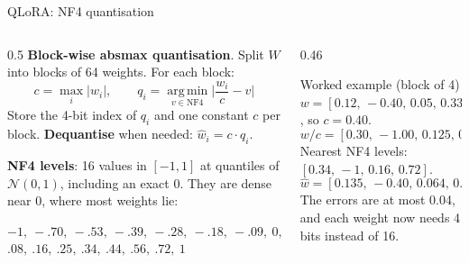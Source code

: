 \documentclass[aspectratio=169,11pt]{beamer}
\begin{document}
\begin{frame}{QLoRA: NF4 quantisation}
  \begin{columns}[T]
    \begin{column}{0.5\textwidth}
      \small
      \textbf{Block-wise absmax quantisation}. Split $W$ into blocks of 64 weights. For each block:
      \[
        c=\max_i|w_i|,\qquad q_i=\operatorname*{arg\,min}_{v\in\text{NF4}}\Big|\frac{w_i}{c}-v\Big|
      \]
      Store the 4-bit index of $q_i$ and one constant $c$ per block.
      \textbf{Dequantise} when needed: $\hat w_i = c\cdot q_i$.
      \vspace{1mm}

      \textbf{NF4 levels}: 16 values in $[-1,1]$ at quantiles of $\mathcal N(0,1)$, including an exact 0. They are dense near 0, where most weights lie:
      \vspace{1mm}

      {\scriptsize $-1,\ -.70,\ -.53,\ -.39,\ -.28,\ -.18,\ -.09,\ 0,$\\
      $.08,\ .16,\ .25,\ .34,\ .44,\ .56,\ .72,\ 1$}
    \end{column}
    \begin{column}{0.46\textwidth}
      \begin{exampleblock}{Worked example (block of 4)}
        \small
        $w=[0.12,\,-0.40,\,0.05,\,0.33]$, so $c=0.40$.
        \[
          w/c=[0.30,\,-1.00,\,0.125,\,0.825]
        \]
        Nearest NF4 levels: $[0.34,\,-1,\,0.16,\,0.72]$.
        \[
          \hat w=[0.135,\,-0.40,\,0.064,\,0.289]
        \]
        The errors are at most 0.04, and each weight now needs 4 bits instead of 16.
      \end{exampleblock}
    \end{column}
  \end{columns}
\end{frame}
\end{document}
